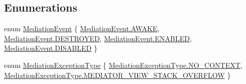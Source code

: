 \subsection*{Enumerations}
\begin{DoxyCompactItemize}
\item 
enum \hyperlink{namespacestrange_1_1extensions_1_1mediation_1_1api_ae5a81bb1edf9fca1d2aca9f4fada72a8}{Mediation\-Event} \{ \hyperlink{namespacestrange_1_1extensions_1_1mediation_1_1api_ae5a81bb1edf9fca1d2aca9f4fada72a8afca549f3541c801906abc34b45e8953e}{Mediation\-Event.\-A\-W\-A\-K\-E}, 
\hyperlink{namespacestrange_1_1extensions_1_1mediation_1_1api_ae5a81bb1edf9fca1d2aca9f4fada72a8a5d7e41d3ac0abca5974598807df874ea}{Mediation\-Event.\-D\-E\-S\-T\-R\-O\-Y\-E\-D}, 
\hyperlink{namespacestrange_1_1extensions_1_1mediation_1_1api_ae5a81bb1edf9fca1d2aca9f4fada72a8ac8cf6eea8f096ed51160b484d97c5bbd}{Mediation\-Event.\-E\-N\-A\-B\-L\-E\-D}, 
\hyperlink{namespacestrange_1_1extensions_1_1mediation_1_1api_ae5a81bb1edf9fca1d2aca9f4fada72a8a055c1a591abb0e8cd86dc969727bcc0b}{Mediation\-Event.\-D\-I\-S\-A\-B\-L\-E\-D}
 \}
\item 
enum \hyperlink{namespacestrange_1_1extensions_1_1mediation_1_1api_aef97993ec02a40c5f887dbfaf4f06e4a}{Mediation\-Exception\-Type} \{ \hyperlink{namespacestrange_1_1extensions_1_1mediation_1_1api_aef97993ec02a40c5f887dbfaf4f06e4aac89f949bb64ae5754bb687bf056de559}{Mediation\-Exception\-Type.\-N\-O\-\_\-\-C\-O\-N\-T\-E\-X\-T}, 
\hyperlink{namespacestrange_1_1extensions_1_1mediation_1_1api_aef97993ec02a40c5f887dbfaf4f06e4aa46ff5442e205aeec7c75b331260f5a49}{Mediation\-Exception\-Type.\-M\-E\-D\-I\-A\-T\-O\-R\-\_\-\-V\-I\-E\-W\-\_\-\-S\-T\-A\-C\-K\-\_\-\-O\-V\-E\-R\-F\-L\-O\-W}
 \}
\end{DoxyCompactItemize}


